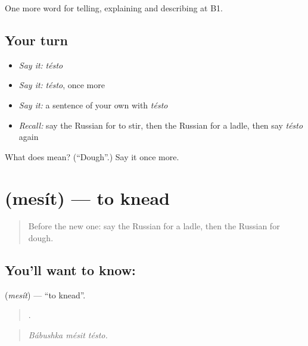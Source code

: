 \begin{grammarlens}[title={What you've built}]
One more word for telling, explaining and describing at B1.
\end{grammarlens}

\subsection*{Your turn}
\begin{itemize}
\raggedright
  \item \emph{Say it:} \emph{tésto}
  \item \emph{Say it:} \emph{tésto}, once more
  \item \emph{Say it:} a sentence of your own with \emph{tésto}
  \item \emph{Recall:} say the Russian for to stir, then the Russian for a ladle, then say \emph{tésto} again
\end{itemize}

\begin{tcolorbox}[breakable,colback=teal!4,colframe=teal!35!black,title={Before you move on}]
What does  mean? (\textquotedblleft{}Dough\textquotedblright{}.) Say it once more.
\end{tcolorbox}
\section[\texorpdfstring{\ru{месить} (mesít)}{месить (mesít)}]{ (mesít) — to knead}

\label{lesson:RU-C331-mesit}



\begin{quote}
Before the new one: say the Russian for a ladle, then the Russian for dough.
\end{quote}

\subsection*{You'll want to know: }
\textbf{} (\emph{mesít}) — \textquotedblleft{}to knead\textquotedblright{}.

\begin{quote}
  .
\end{quote}

\begin{quote}
\emph{Bábushka mésit tésto.}
\end{quote}

